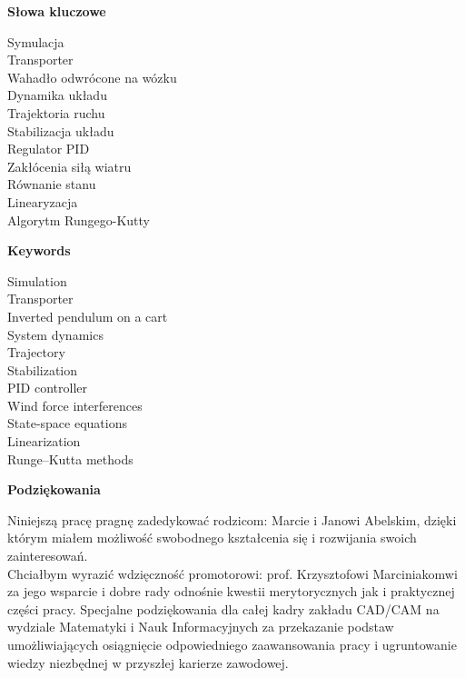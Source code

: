 \documentclass[12pt, oneside]{report}
\theoremstyle{definition}
\begin{document}

\newpage
\pagestyle{empty}
\vspace*{\fill}
\begin{center}
\LARGE\textbf{Słowa kluczowe}\\
\end{center}
\begin{center}
Symulacja\\
Transporter\\
Wahadło odwrócone na wózku\\
Dynamika układu\\
Trajektoria ruchu\\
Stabilizacja układu\\
Regulator PID\\
Zakłócenia siłą wiatru \\
Równanie stanu\\
Linearyzacja\\
Algorytm Rungego-Kutty
\end{center}
\vspace{\fill}

\newpage
\pagestyle{empty}
\vspace*{\fill}
\begin{center}
\LARGE\textbf{Keywords}\\
\end{center}
\begin{center}
Simulation\\
Transporter\\
Inverted pendulum on a cart\\
System dynamics\\
Trajectory\\
Stabilization\\
PID controller\\
Wind force interferences\\
State-space equations\\
Linearization\\
Runge–Kutta methods
\end{center}
\vspace{\fill}

\newpage
\pagestyle{empty}
\vspace*{\fill}
\begin{center}
\LARGE\textbf{Podziękowania}\\
\end{center}
Niniejszą pracę pragnę zadedykować rodzicom: Marcie i Janowi Abelskim, dzięki którym miałem możliwość swobodnego kształcenia się i rozwijania swoich zainteresowań.
\vspace{10px}
\\
Chciałbym wyrazić wdzięczność promotorowi: prof. Krzysztofowi Marciniakomwi za jego wsparcie i dobre rady odnośnie kwestii merytorycznych jak i praktycznej części pracy. Specjalne podziękowania dla całej kadry zakładu CAD/CAM na wydziale Matematyki i Nauk Informacyjnych za przekazanie podstaw umożliwiających osiągnięcie odpowiedniego zaawansowania pracy i ugruntowanie wiedzy niezbędnej w przyszłej karierze zawodowej.
\end{document}

